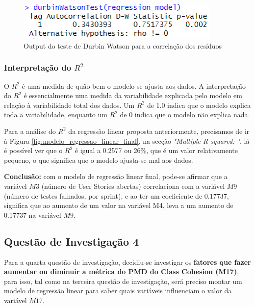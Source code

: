 \documentclass[%
 aip,
cp,  %
 amsmath,amssymb,%
 reprint,%
]{revtex4-2}
\begin{document}
\begin{figure}[!h]
    \centering
    \includegraphics[width=10cm]{imagens/questao3/questao3DurbinWatsonTest.png}
    \caption{Output do teste de Durbin Watson para a correlação dos resíduos}
    \label{questao3OutputTesteDurbinWatson}
\end{figure}



\subsubsection{Interpretação do $R^2$ }
O $R^2$ é uma medida de quão bem o modelo se ajusta aos dados. A interpretação do $R^2$ é essencialmente uma medida da variabilidade explicada pelo modelo em relação à variabilidade total dos dados. Um $R^2$ de 1.0 indica que o modelo explica toda a variabilidade, enquanto um 
$R^2$ de 0 indica que o modelo não explica nada.

Para a análise do $R^2$ da regressão linear proposta anteriormente, precisamos de ir à Figura \ref{fig:modelo_regressao_linear_final}, na secção \textit{"Multiple R-squared: "}, lá é possível ver que o $R^2$ é igual a 0.2577 ou 26\%, que é um valor relativamente pequeno, o que significa que o modelo ajusta-se mal aos dados.

\vspace{2cm}

\textbf{Conclusão:} com o modelo de regressão linear final, pode-se afirmar que a variável $M3$ (número de User Stories abertas) correlaciona com a variável $M9$ (número de testes falhados, por sprint), e ao ter um coeficiente de 0.17737, significa que ao aumento de um valor na variável M4, leva a um aumento de 0.17737 na variável $M9$.

\newpage


\subsection{Questão de Investigação 4}
Para a quarta questão de investigação, decidiu-se investigar os \textbf{fatores que fazer aumentar ou diminuir a métrica do PMD do Class Cohesion (M17)}, para isso, tal como na terceira questão de investigação, será preciso montar um modelo de regressão linear para saber quais variáveis influenciam o valor da variável $M17$.
\end{document}
